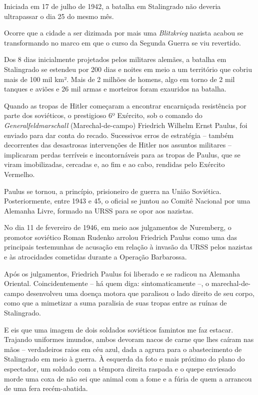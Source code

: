 Iniciada em 17 de julho de 1942, a batalha em Stalingrado não deveria
ultrapassar o dia 25 do mesmo mês.

Ocorre que a cidade a ser dizimada por mais uma \emph{Blitzkrieg}
nazista acabou se transformando no marco em que o curso da Segunda
Guerra se viu revertido.

Dos 8 dias inicialmente projetados pelos militares alemães, a batalha em
Stalingrado se estendeu por 200 dias e noites em meio a um território
que cobriu mais de 100 mil km². Mais de 2 milhões de homens, algo em
torno de 2 mil tanques e aviões e 26 mil armas e morteiros foram
exauridos na batalha.

Quando as tropas de Hitler começaram a encontrar encarniçada resistência
por parte dos soviéticos, o prestigioso 6º Exército, sob o comando do
\emph{Generalfeldmarschall} (Marechal-de-campo) Friedrich Wilhelm Ernst
Paulus, foi enviado para dar conta do recado. Sucessivos erros de
estratégia -- também decorrentes das desastrosas intervenções de Hitler
nos assuntos militares -- implicaram perdas terríveis e incontornáveis
para as tropas de Paulus, que se viram imobilizadas, cercadas e, ao fim
e ao cabo, rendidas pelo Exército Vermelho.

Paulus se tornou, a princípio, prisioneiro de guerra na União Soviética.
Posteriormente, entre 1943 e 45, o oficial se juntou ao Comitê Nacional
por uma Alemanha Livre, formado na URSS para se opor aos nazistas.

No dia 11 de fevereiro de 1946, em meio aos julgamentos de Nuremberg, o
promotor soviético Roman Rudenko arrolou Friedrich Paulus como uma das
principais testemunhas de acusação em relação à invasão da URSS pelos
nazistas e às atrocidades cometidas durante a Operação Barbarossa.

Após os julgamentos, Friedrich Paulus foi liberado e se radicou na
Alemanha Oriental. Coincidentemente -- há quem diga: sintomaticamente
--, o marechal-de-campo desenvolveu uma doença motora que paralisou o
lado direito de seu corpo, como que a mimetizar a suma paralisia de suas
tropas entre as ruínas de Stalingrado.

E eis que uma imagem de dois soldados soviéticos famintos me faz
estacar. Trajando uniformes imundos, ambos devoram nacos de carne que
lhes caíram nas mãos -- verdadeiros raios em céu azul, dada a agrura
para o abastecimento de Stalingrado em meio à guerra. À esquerda da foto
e mais próximo do plano do espectador, um soldado com a têmpora direita
raspada e o quepe enviesado morde uma coxa de não sei que animal com a
fome e a fúria de quem a arrancou de uma fera recém-abatida.

